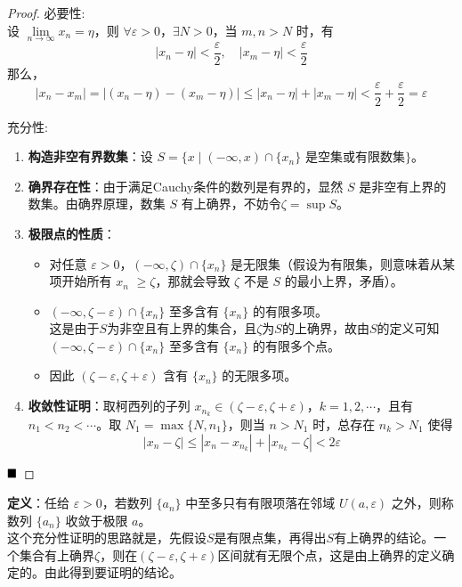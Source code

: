 \begin{proof}
必要性:\\
设 $\lim\limits_{n \to \infty} x_n = \eta$，则 $\forall \varepsilon > 0$，$\exists N > 0$，当 $m, n > N$ 时，有
\[
|x_n - \eta| < \frac{\varepsilon}{2}, \quad |x_m - \eta| < \frac{\varepsilon}{2}
\]
那么，
\[
|x_n - x_m| = |(x_n - \eta) - (x_m - \eta)| \leq |x_n - \eta| + |x_m - \eta| < \frac{\varepsilon}{2} + \frac{\varepsilon}{2} = \varepsilon
\]

充分性:\\
\begin{enumerate}
    \item \textbf{构造非空有界数集}：设 $S = \{x \mid (-\infty, x) \cap \{x_n\}$ 是空集或有限数集$\}$。

    \item \textbf{确界存在性}：由于满足Cauchy条件的数列是有界的，显然 $S$ 是非空有上界的数集。由确界原理，数集 $S$ 有上确界，不妨令$\zeta = \sup S$。
    
    \item \textbf{极限点的性质}：
    \begin{itemize}
        \item 对任意 $\varepsilon > 0$，$(-\infty, \zeta) \cap \{x_n\}$ 是无限集（假设为有限集，则意味着从某项开始所有 \( x_n \)  \(\geq \zeta\)，那就会导致 \(\zeta\) 不是 \(S\) 的最小上界，矛盾）。
        \item $(-\infty, \zeta - \varepsilon) \cap \{x_n\}$ 至多含有 $\{x_n\}$ 的有限多项。\\
        这是由于$S$为非空且有上界的集合，且$\zeta$为$S$的上确界，故由$S$的定义可知$(-\infty, \zeta - \varepsilon) \cap \{x_n\}$ 至多含有 $\{x_n\}$ 的有限多个点。
        \item 因此 $(\zeta - \varepsilon, \zeta + \varepsilon)$ 含有 $\{x_n\}$ 的无限多项。
    \end{itemize}
    \item \textbf{收敛性证明}：取柯西列的子列 $x_{n_k} \in (\zeta - \varepsilon, \zeta + \varepsilon)$，$k = 1, 2, \cdots$，且有 $n_1 < n_2 < \cdots$。取 $N_1 = \max\{N, n_1\}$，则当 $n > N_1$ 时，总存在 $n_k > N_1$ 使得
    \[
    |x_n - \zeta| \leq |x_n - x_{n_k}| + |x_{n_k} - \zeta| < 2\varepsilon
    \]
\end{enumerate}
$\hfill \blacksquare$
\end{proof}
\begin{note}
    \textbf{定义}：任给 $\varepsilon > 0$，若数列 $\{a_n\}$ 中至多只有有限项落在邻域 $U(a, \varepsilon)$ 之外，则称数列 $\{a_n\}$ 收敛于极限 $a$。\\
    这个充分性证明的思路就是，先假设$S$是有限点集，再得出$S$有上确界的结论。一个集合有上确界$\zeta$，则在$(\zeta - \varepsilon, \zeta + \varepsilon)$区间就有无限个点，这是由上确界的定义确定的。由此得到要证明的结论。
\end{note}

